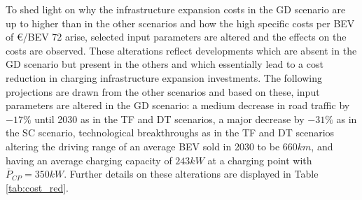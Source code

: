 To shed light on why the infrastructure expansion costs in the GD scenario are up to  higher than in the other scenarios and how the high specific costs per \ac{BEV} of \euro/\ac{BEV} 72 arise,  selected input parameters are altered and the effects on the costs are observed. These alterations reflect developments which are absent in the GD scenario but present in the others and which essentially lead to a cost reduction in charging infrastructure expansion investments. The following projections are drawn from the other scenarios and based on these, input parameters are altered in the GD scenario: a medium decrease in road traffic by $-17\%$ until 2030 as in the TF and DT scenarios, a major decrease by $-31\%$ as in the SC scenario, technological breakthroughs as in the TF and DT scenarios altering the driving range of an average \ac{BEV} sold in 2030 to be $660km$, and having an average charging capacity of $243kW$ at a charging point with $\overline{P}_{CP} = 350 kW$. Further details on these alterations are displayed in Table \ref{tab:cost_red}. 


